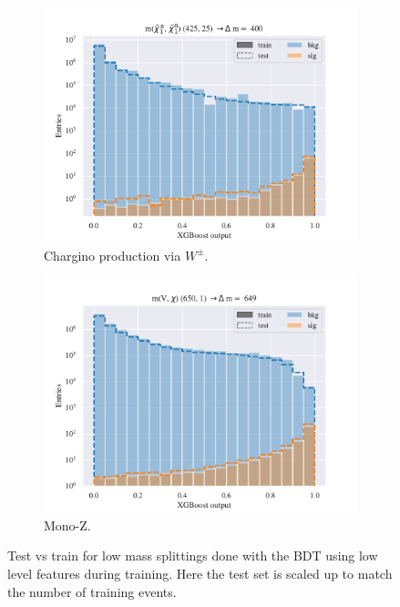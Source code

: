 \begin{figure}[H]
\begin{subfigure}[t!]{0.49\textwidth}
        \includegraphics[width = \textwidth]{Figures/WW/BDT/Low_level/High/scaled_train_test_395330.pdf}
        \caption{Chargino production via $W^\pm$.}
        \label{fig:}
    \end{subfigure}
    \begin{subfigure}[t!]{0.49\textwidth}
        \includegraphics[width = \textwidth]{Figures/Mono_Z/ML/BDT/Low_level/High/scaled_train_test_310617.pdf}
        \caption{Mono-Z.}
        \label{fig:}
    \end{subfigure}
    \caption{Test vs train for low mass splittings done with the BDT using low level features during training. Here the test set is scaled up to match the number of training events.}
    \label{fig:Non}
\end{figure}


